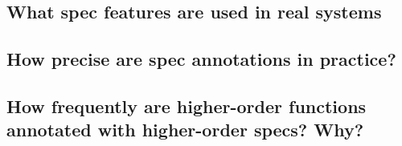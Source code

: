 

\subsection{What spec features are used in real systems}

\subsection{How precise are spec annotations in practice?}

\subsection{How frequently are higher-order functions annotated with higher-order specs? Why?}
